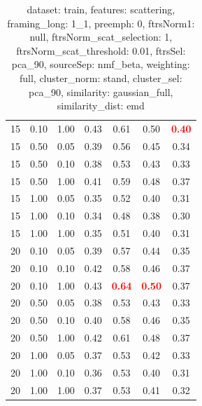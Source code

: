 \documentclass[12pt,a4paper,fleqn]{tufte-handout}
\begin{document}
\begin{table}
\begin{center}
\begin{tabular}{lllcccc}
15 & 0.10 & 1.00 & 0.43 & 0.61 & 0.50 & \textbf{\textcolor{red}{0.40}} \\                   
15 & 0.50 & 0.05 & 0.39 & 0.56 & 0.45 & 0.34 \\                   
15 & 0.50 & 0.10 & 0.38 & 0.53 & 0.43 & 0.33 \\                   
15 & 0.50 & 1.00 & 0.41 & 0.59 & 0.48 & 0.37 \\                   
15 & 1.00 & 0.05 & 0.35 & 0.52 & 0.40 & 0.31 \\                   
15 & 1.00 & 0.10 & 0.34 & 0.48 & 0.38 & 0.30 \\                   
15 & 1.00 & 1.00 & 0.35 & 0.51 & 0.40 & 0.31 \\                   
20 & 0.10 & 0.05 & 0.39 & 0.57 & 0.44 & 0.35 \\                   
20 & 0.10 & 0.10 & 0.42 & 0.58 & 0.46 & 0.37 \\                   
20 & 0.10 & 1.00 & 0.43 & \textbf{\textcolor{red}{0.64}} & \textbf{\textcolor{red}{0.50}} & 0.37 \\                   
20 & 0.50 & 0.05 & 0.38 & 0.53 & 0.43 & 0.33 \\                   
20 & 0.50 & 0.10 & 0.40 & 0.58 & 0.46 & 0.35 \\                   
20 & 0.50 & 1.00 & 0.42 & 0.61 & 0.48 & 0.37 \\                   
20 & 1.00 & 0.05 & 0.37 & 0.53 & 0.42 & 0.33 \\                   
20 & 1.00 & 0.10 & 0.36 & 0.53 & 0.40 & 0.31 \\                   
20 & 1.00 & 1.00 & 0.37 & 0.53 & 0.41 & 0.32 \\                   
\end{tabular}                   
\end{center}                   
\caption{dataset: train, features: scattering, framing\_long: 1\_1, preemph: 0, ftrsNorm1: null, ftrsNorm\_scat\_selection: 1, ftrsNorm\_scat\_threshold: 0.01, ftrsSel: pca\_90, sourceSep: nmf\_beta, weighting: full, cluster\_norm: stand, cluster\_sel: pca\_90, similarity: gaussian\_full, similarity\_dist: emd}                   
\label{datasetrFeaturscFraminlong1_1Preemp0Ftrsnorm1nuFtrsnoscatselect1Ftrsnoscatthresh0.01Ftrsselpc90SourcesepnmbeWeightfuClustenormstClusteselpc90SimilagafuSimiladistem}                   
\end{table}                   
 
\end{document}
